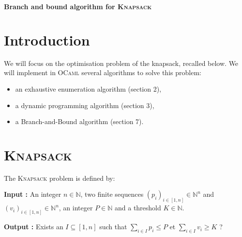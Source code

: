 \documentclass[a4paper,12pt]{article}
\begin{document}
\begin{center}
\Large\textbf{Branch and bound algorithm for \textsc{Knapsack}}
\end{center}

\section*{Introduction}
We will focus on the optimisation problem of the knapsack, recalled below. We will implement in \textsc{OCaml} several algorithms to solve this problem:
\begin{itemize}
    \item an exhaustive enumeration algorithm (section 2),
    \item a dynamic programming algorithm (section 3),
    \item a Branch-and-Bound algorithm (section 7).
\end{itemize}

\section*{\textsc{Knapsack}}

The \textsc{Knapsack} problem is defined by:
    
\medskip
    
\textbf{Input :} An integer $n \in \mathbb{N}$, two finite sequences $(p_i)_{i \in [1,n]} \in \mathbb{N}^n$ and $(v_i)_{i \in [1,n]} \in \mathbb{N}^n$, an integer $P \in \mathbb{N}$ and a threshold $K \in \mathbb{N}$.
    
\textbf{Output :} Exists an $I \subseteq [1,n]$ such that $\sum_{i \in I} p_i \leq P$ et $\sum_{i \in I} v_i \geq K$ ?
    
\end{document}
